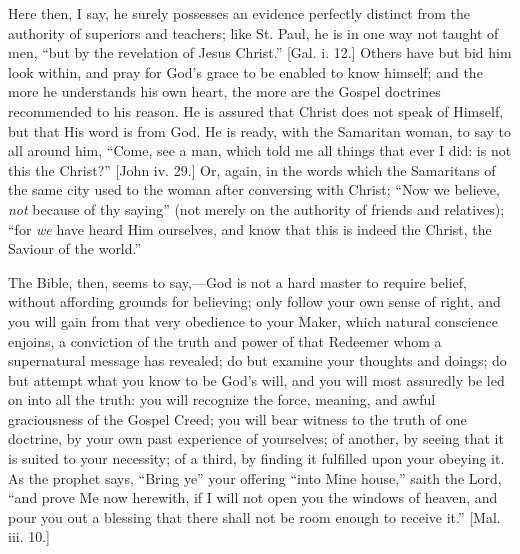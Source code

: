 Here then, I say, he surely possesses an evidence perfectly
distinct from the authority of superiors and teachers; like St. Paul,
he is in one way not taught of men, ``but by the revelation of
Jesus Christ.'' [Gal. i. 12.] Others have but bid him look within,
and pray for God's grace to be enabled to know himself; and the more
he understands his own heart, the more are the Gospel doctrines
recommended to his reason. He is assured that Christ does not speak of
Himself, but that His word is from God. He is ready, with the
Samaritan woman, to say to all around him, ``Come, see a man,
which told me all things that ever I did: is not this the
Christ?'' [John iv. 29.] Or, again, in the words which the
Samaritans of the same city used to the woman after conversing with
Christ; ``Now we believe, \emph{not} because of thy saying''
(not merely on the authority of friends and relatives); ``for \emph{we}
have heard Him ourselves, and know that this is indeed the Christ, the
Saviour of the world.''

The Bible, then, seems to say,—God is not a hard master to
require belief, without affording grounds for believing; only follow
your own sense of right, and you will gain from that very obedience to
your Maker, which natural conscience enjoins, a conviction of the
truth and power of that Redeemer whom a supernatural message has
revealed; do but examine your thoughts and doings; do but attempt what
you know to be God's will, and you will most assuredly be led on into
all the truth: you will recognize the force, meaning, and awful
graciousness of the Gospel Creed; you will bear witness to the truth
of one doctrine, by your own past experience of yourselves; of
another, by seeing that it is suited to your necessity; of a third, by
finding it fulfilled upon your obeying it. As the prophet says,
``Bring ye'' your offering ``into Mine house,'' saith
the Lord, ``and prove Me now herewith, if I will not open you the
windows of heaven, and pour you out a blessing that there shall not be
room enough to receive it.'' [Mal. iii. 10.]


